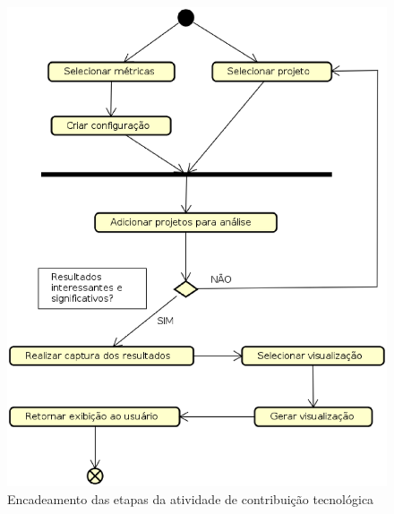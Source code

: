 \begin{figure}[h]
  \centering
    \includegraphics[keepaspectratio=true,scale=0.5]
    {figuras/metodotologia_atividades.eps}
  \caption{Encadeamento das etapas da atividade de contribuição tecnológica}
  \label{fig:metodotologia_atividades}
\end{figure}


